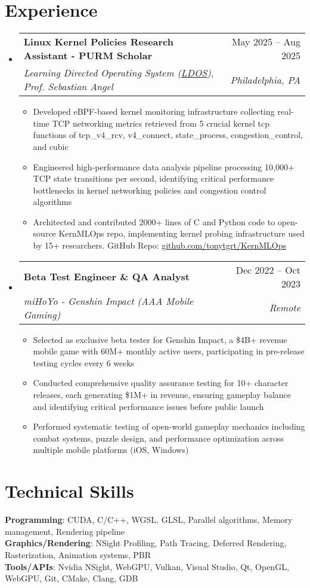 \documentclass[letterpaper,11pt]{article}
\makeatletter
\newcommand{\resumeItem}[1]{
  \item\small{
    {#1 \vspace{-3pt}}
  }
}
\newcommand{\resumeSubheading}[4]{
  \vspace{-2pt}\item
    \begin{tabular*}{0.97\textwidth}[t]{l@{\extracolsep{\fill}}r}
      \textbf{#1} & #2 \\
      \textit{\small#3} & \textit{\small #4} \\
    \end{tabular*}\vspace{-7pt}
}
\newcommand{\resumeSubHeadingListStart}{\begin{itemize}[leftmargin=0.15in, label={}]}
\newcommand{\resumeSubHeadingListEnd}{\end{itemize}}
\newcommand{\resumeItemListStart}{\begin{itemize}}
\newcommand{\resumeItemListEnd}{\end{itemize}\vspace{-5pt}}
\makeatother
\begin{document}
\section{Experience}
  \resumeSubHeadingListStart
    \resumeSubheading
    {Linux Kernel Policies Research Assistant - PURM Scholar}{May 2025 -- Aug 2025}
    {Learning Directed Operating System (\href{https://ldos.utexas.edu/}{\uline{LDOS}}), Prof. Sebastian Angel}{Philadelphia, PA}
    \resumeItemListStart
        \resumeItem{Developed eBPF-based kernel monitoring infrastructure collecting real-time TCP networking metrics retrieved from 5 crucial kernel tcp functions of tcp\_v4\_rcv, v4\_connect, state\_process, congestion\_control, and cubic}
        \resumeItem{Engineered high-performance data analysis pipeline processing 10,000+ TCP state transitions per second, identifying critical performance bottlenecks in kernel networking policies and congestion control algorithms}
        \resumeItem{Architected and contributed 2000+ lines of C and Python code to open-source KernMLOps repo, implementing kernel probing infrastructure used by 15+ researchers. GitHub Repo: \href{https://github.com/tonytgrt/KernMLOps}{\uline{github.com/tonytgrt/KernMLOps}}}
    \resumeItemListEnd


    \resumeSubheading
      {Beta Test Engineer \& QA Analyst}{Dec 2022 -- Oct 2023}
      {miHoYo - Genshin Impact (AAA Mobile Gaming)}{Remote}
      \resumeItemListStart
        \resumeItem{Selected as exclusive beta tester for Genshin Impact, a \$4B+ revenue mobile game with 60M+ monthly active users, participating in pre-release testing cycles every 6 weeks}
        \resumeItem{Conducted comprehensive quality assurance testing for 10+ character releases, each generating \$1M+ in revenue, ensuring gameplay balance and identifying critical performance issues before public launch}
        \resumeItem{Performed systematic testing of open-world gameplay mechanics including combat systems, puzzle design, and performance optimization across multiple mobile platforms (iOS, Windows)}
        \resumeItemListEnd
  \resumeSubHeadingListEnd


\enlargethispage{20pt}


%
\section{Technical Skills}
 \begin{itemize}[leftmargin=0.15in, label={}]
    \small{\item{
    \textbf{Programming}{: CUDA, C/C++, WGSL, GLSL, Parallel algorithms, Memory management, Rendering pipeline} \\
    \textbf{Graphics/Rendering}{: NSight Profiling, Path Tracing, Deferred Rendering, Rasterization, Animation systems, PBR} \\
    \textbf{Tools/APIs}{: Nvidia NSight, WebGPU, Vulkan, Visual Studio, Qt, OpenGL, WebGPU, Git, CMake, Clang, GDB}
    }}
 \end{itemize}


\end{document}
